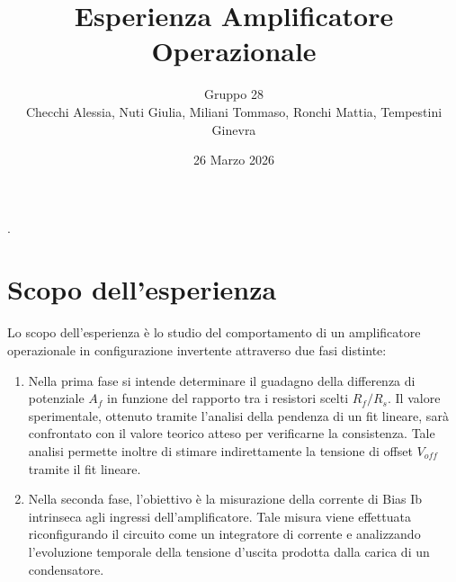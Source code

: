 \documentclass[a4paper, oneside]{article}
\title{Esperienza Amplificatore Operazionale}
\author{Gruppo 28 \\ Checchi Alessia, Nuti Giulia, Miliani Tommaso, Ronchi Mattia, Tempestini Ginevra}
\date{26 Marzo 2026}
\begin{document}
                {}          %
                {}          %
                {\slshape}  %
                {}          %
                {\bfseries} %
                {.}         %
                {\newline}  %
                {}          %
\theoremstyle{theoremEnv}

\newtheorem{definition}{Definizione}[section]
\newtheorem{theorem}{Teorema}[section]
\newtheorem{lemma}{Proposizione}[section]
\newtheorem{observation}{Osservazione}[section]
\newtheorem{corollary}{Corollario}[theorem]
\newtheorem{example}{Esempio}[section]
\newtheorem{remark}{Enunciato}[section]

\maketitle

\section{Scopo dell'esperienza}
Lo scopo dell'esperienza è lo studio del comportamento di un amplificatore operazionale in configurazione invertente
attraverso due fasi distinte:
\begin{enumerate}
    \item Nella prima fase si intende determinare il guadagno della differenza di potenziale $A_f$ in funzione del
    rapporto tra i resistori scelti $R_f/R_s$. Il valore sperimentale, ottenuto tramite l'analisi della pendenza di
    un fit lineare, sarà confrontato con il valore teorico atteso per verificarne la consistenza.
    Tale analisi permette inoltre di stimare indirettamente la tensione di offset $V_{off}$ tramite il fit lineare.
    \item Nella seconda fase, l'obiettivo è la misurazione della corrente di Bias Ib intrinseca agli
    ingressi dell'amplificatore. Tale misura viene effettuata riconfigurando il circuito come un
    integratore di corrente e analizzando l'evoluzione temporale della tensione d'uscita prodotta
    dalla carica di un condensatore.
\end{enumerate}
\end{document}
